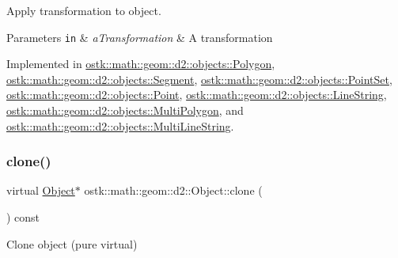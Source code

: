 Apply transformation to object. 


\begin{DoxyParams}[1]{Parameters}
\mbox{\tt in}  & {\em a\+Transformation} & A transformation \\
\hline
\end{DoxyParams}


Implemented in \hyperlink{classostk_1_1math_1_1geom_1_1d2_1_1objects_1_1_polygon_a00d04368f01daa0b234b403321453bbf}{ostk\+::math\+::geom\+::d2\+::objects\+::\+Polygon}, \hyperlink{classostk_1_1math_1_1geom_1_1d2_1_1objects_1_1_segment_afbd5fe1b8136f738a0e93b934b290394}{ostk\+::math\+::geom\+::d2\+::objects\+::\+Segment}, \hyperlink{classostk_1_1math_1_1geom_1_1d2_1_1objects_1_1_point_set_a8c4140ca8434580a95df773d3aeed5bb}{ostk\+::math\+::geom\+::d2\+::objects\+::\+Point\+Set}, \hyperlink{classostk_1_1math_1_1geom_1_1d2_1_1objects_1_1_point_aa880df23e5ee93a60dad85597c600fb0}{ostk\+::math\+::geom\+::d2\+::objects\+::\+Point}, \hyperlink{classostk_1_1math_1_1geom_1_1d2_1_1objects_1_1_line_string_afd26337c26696a0ff1b4b2e94e58f17c}{ostk\+::math\+::geom\+::d2\+::objects\+::\+Line\+String}, \hyperlink{classostk_1_1math_1_1geom_1_1d2_1_1objects_1_1_multi_polygon_a2dfac474c7787aac7ea0822e409bbff5}{ostk\+::math\+::geom\+::d2\+::objects\+::\+Multi\+Polygon}, and \hyperlink{classostk_1_1math_1_1geom_1_1d2_1_1objects_1_1_multi_line_string_ada5fe5a183b6628831867b416901459e}{ostk\+::math\+::geom\+::d2\+::objects\+::\+Multi\+Line\+String}.

\mbox{\label{classostk_1_1math_1_1geom_1_1d2_1_1_object_a98dedc6792aef35308966ca768eb3e14}} 
\subsubsection{\texorpdfstring{clone()}{clone()}}
{\footnotesize\ttfamily virtual \hyperlink{classostk_1_1math_1_1geom_1_1d2_1_1_object}{Object}$\ast$ ostk\+::math\+::geom\+::d2\+::\+Object\+::clone (\begin{DoxyParamCaption}{ }\end{DoxyParamCaption}) const\hspace{0.3cm}{\ttfamily [pure virtual]}}



Clone object (pure virtual) 

